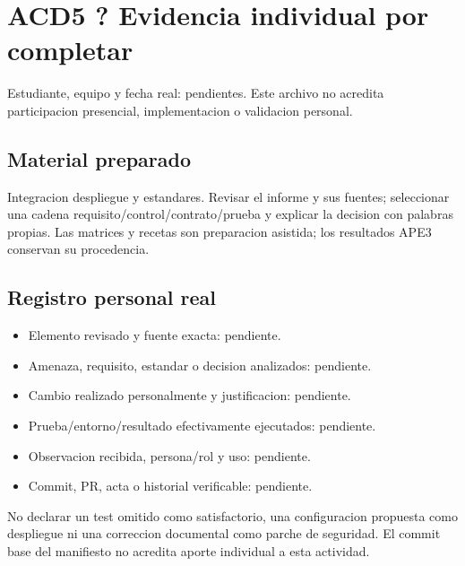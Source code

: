 \documentclass[12pt,a4paper]{report}
\providecommand{\tightlist}{\setlength{\itemsep}{0pt}\setlength{\parskip}{0pt}}
\begin{document}
\chapter{ACD5 ? Evidencia individual por
completar}\label{ACD5-semana-5-anexo3-acd5--evidencia-individual-por-completar}

Estudiante, equipo y fecha real: pendientes. Este archivo no acredita
participacion presencial, implementacion o validacion personal.

\section{Material
preparado}\label{ACD5-semana-5-anexo3-material-preparado}

Integracion despliegue y estandares. Revisar el informe y sus fuentes;
seleccionar una cadena requisito/control/contrato/prueba y explicar la
decision con palabras propias. Las matrices y recetas son preparacion
asistida; los resultados APE3 conservan su procedencia.

\section{Registro personal
real}\label{ACD5-semana-5-anexo3-registro-personal-real}

\begin{itemize}
\tightlist
\item
  Elemento revisado y fuente exacta: pendiente.
\item
  Amenaza, requisito, estandar o decision analizados: pendiente.
\item
  Cambio realizado personalmente y justificacion: pendiente.
\item
  Prueba/entorno/resultado efectivamente ejecutados: pendiente.
\item
  Observacion recibida, persona/rol y uso: pendiente.
\item
  Commit, PR, acta o historial verificable: pendiente.
\end{itemize}

No declarar un test omitido como satisfactorio, una configuracion
propuesta como despliegue ni una correccion documental como parche de
seguridad. El commit base del manifiesto no acredita aporte individual a
esta actividad.
\end{document}
